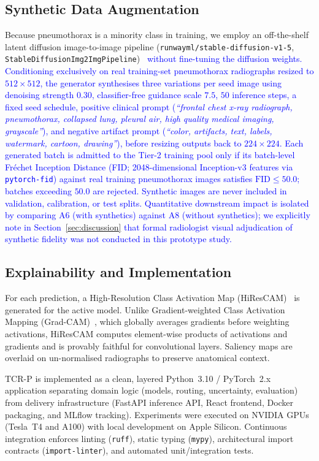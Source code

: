 \documentclass[diagnostics,article,submit,moreauthors]{Definitions/mdpi}
\newcommand{\rev}[1]{\textcolor{blue}{#1}}
\begin{document}
\subsection{Synthetic Data Augmentation}

Because pneumothorax is a minority class in training, we employ an off-the-shelf latent diffusion image-to-image pipeline (\texttt{runwayml/stable-diffusion-v1-5}, \texttt{StableDiffusionImg2ImgPipeline})~\cite{rombach2022high} \rev{without fine-tuning the diffusion weights. Conditioning exclusively on real training-set pneumothorax radiographs resized to $512\times 512$, the generator synthesises three variations per seed image using denoising strength $0.30$, classifier-free guidance scale $7.5$, $50$ inference steps, a fixed seed schedule, positive clinical prompt (\emph{``frontal chest x-ray radiograph, pneumothorax, collapsed lung, pleural air, high quality medical imaging, grayscale''}), and negative artifact prompt (\emph{``color, artifacts, text, labels, watermark, cartoon, drawing''}), before resizing outputs back to $224\times 224$. Each generated batch is admitted to the Tier-2 training pool only if its batch-level Fr\'echet Inception Distance (FID; 2048-dimensional Inception-v3 features via \texttt{pytorch-fid}) against real training pneumothorax images satisfies $\mathrm{FID} \le 50.0$; batches exceeding $50.0$ are rejected. Synthetic images are never included in validation, calibration, or test splits. Quantitative downstream impact is isolated by comparing A6 (with synthetics) against A8 (without synthetics); we explicitly note in Section~\ref{sec:discussion} that formal radiologist visual adjudication of synthetic fidelity was not conducted in this prototype study.}

\subsection{Explainability and Implementation}

For each prediction, a High-Resolution Class Activation Map (HiResCAM)~\cite{draelos2020hirescam} is generated for the active model. Unlike Gradient-weighted Class Activation Mapping (Grad-CAM)~\cite{selvaraju2017gradcam}, which globally averages gradients before weighting activations, HiResCAM computes element-wise products of activations and gradients and is provably faithful for convolutional layers. Saliency maps are overlaid on un-normalised radiographs to preserve anatomical context.

TCR-P is implemented as a clean, layered Python~3.10 / PyTorch~2.x application separating domain logic (models, routing, uncertainty, evaluation) from delivery infrastructure (FastAPI inference API, React frontend, Docker packaging, and MLflow tracking). Experiments were executed on NVIDIA GPUs (Tesla~T4 and A100) with local development on Apple Silicon. Continuous integration enforces linting (\texttt{ruff}), static typing (\texttt{mypy}), architectural import contracts (\texttt{import-linter}), and automated unit/integration tests.
\end{document}
